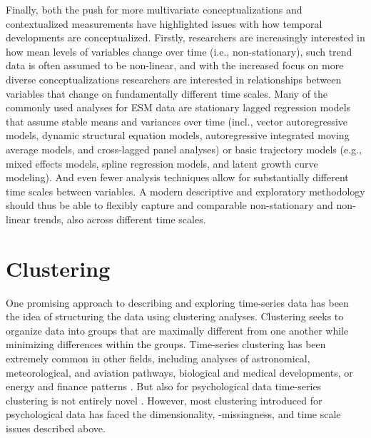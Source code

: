 \documentclass[man, 12pt, a4paper]{apa7}
\theoremstyle{break}
\theoremstyle{plain}
\begin{document}
Finally, both the push for more multivariate conceptualizations and contextualized measurements have highlighted issues with how temporal developments are conceptualized. Firstly, researchers are increasingly interested in how mean levels of variables change over time (i.e., non-stationary), such trend data is often assumed to be non-linear, and with the increased focus on more diverse conceptualizations researchers are interested in relationships between variables that change on fundamentally different time scales. Many of the commonly used analyses for ESM data are stationary lagged regression models that assume stable means and variances over time (incl., vector autoregressive models, dynamic structural equation models, autoregressive integrated moving average models, and cross-lagged panel analyses) or basic trajectory models (e.g., mixed effects models, spline regression models, and latent growth curve modeling). And even fewer analysis techniques allow for substantially different time scales between variables. A modern descriptive and exploratory methodology should thus be able to flexibly capture and comparable non-stationary and non-linear trends, also across different time scales.

\section{Clustering}
One promising approach to describing and exploring time-series data has been the idea of structuring the data using clustering analyses. Clustering seeks to organize data into groups that are maximally different from one another while minimizing differences within the groups. Time-series clustering has been extremely common in other fields, including analyses of astronomical, meteorological, and aviation pathways, biological and medical developments, or energy and finance patterns \citep{Aghabozorgi2015}. But also for psychological data time-series clustering is not entirely novel \citep[e.g.,][]{ernst2021}. However, most clustering introduced for psychological data has faced the dimensionality, -missingness, and time scale issues described above.
\end{document}
